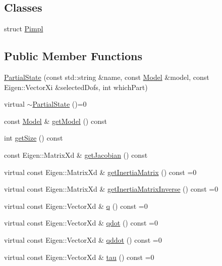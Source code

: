 \subsection*{Classes}
\begin{DoxyCompactItemize}
\item 
struct \hyperlink{structocra_1_1PartialState_1_1Pimpl}{Pimpl}
\end{DoxyCompactItemize}
\subsection*{Public Member Functions}
\begin{DoxyCompactItemize}
\item 
\hyperlink{classocra_1_1PartialState_ab6f225c821033965da2ccd5924c23915}{Partial\+State} (const std\+::string \&name, const \hyperlink{classocra_1_1Model}{Model} \&model, const Eigen\+::\+Vector\+Xi \&selected\+Dofs, int which\+Part)
\item 
virtual \hyperlink{classocra_1_1PartialState_a6426dc8cd115e310f16f0d244802618f}{$\sim$\+Partial\+State} ()=0
\item 
const \hyperlink{classocra_1_1Model}{Model} \& \hyperlink{classocra_1_1PartialState_a2de65bbf0d2bb85a98d444c3f3bf0b06}{get\+Model} () const
\item 
int \hyperlink{classocra_1_1PartialState_a220a155999e190427083af329d1f52b0}{get\+Size} () const
\item 
const Eigen\+::\+Matrix\+Xd \& \hyperlink{classocra_1_1PartialState_a563b7fb82df68c847120211884019e17}{get\+Jacobian} () const
\item 
virtual const Eigen\+::\+Matrix\+Xd \& \hyperlink{classocra_1_1PartialState_ad811a25932f0fad439242ebd48841162}{get\+Inertia\+Matrix} () const =0
\item 
virtual const Eigen\+::\+Matrix\+Xd \& \hyperlink{classocra_1_1PartialState_a83979e39dd3631861c724514e49cb8b4}{get\+Inertia\+Matrix\+Inverse} () const =0
\item 
virtual const Eigen\+::\+Vector\+Xd \& \hyperlink{classocra_1_1PartialState_a28f537d2c569eddb7f7d6dbbea073226}{q} () const =0
\item 
virtual const Eigen\+::\+Vector\+Xd \& \hyperlink{classocra_1_1PartialState_a5af623db2ae7e68cb4658f226e8ae006}{qdot} () const =0
\item 
virtual const Eigen\+::\+Vector\+Xd \& \hyperlink{classocra_1_1PartialState_ad12359c11926c2151dc1459e88b9fedc}{qddot} () const =0
\item 
virtual const Eigen\+::\+Vector\+Xd \& \hyperlink{classocra_1_1PartialState_a875575d215c7fe9278d47ff6f392bb84}{tau} () const =0
\end{DoxyCompactItemize}

